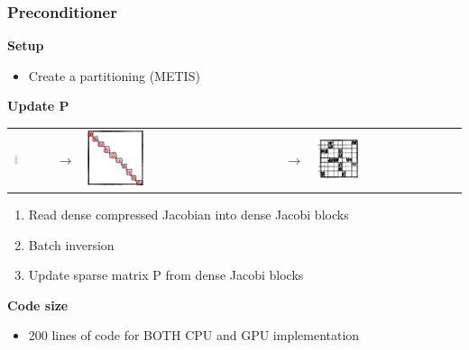 \begin{frame}
  \frametitle{Preconditioner}
  {\bf Setup}
  \begin{itemize}
    \item Create a partitioning (METIS)
  \end{itemize}
  {\bf Update P}
  \begin{tabular}{m{}m{}m{}m{}m{}}
        \includegraphics[width=0.15\textwidth]{./figures/compressed}
    &
    {\Huge $\rightarrow$}
    &
        \includegraphics[width=0.3\textwidth]{figures/gpublocks}
    &
    {\Huge $\rightarrow$}
    &
        \includegraphics[width=0.3\textwidth]{./figures/csr}
    \\
  \end{tabular}
    \begin{enumerate}
      \item Read dense compressed Jacobian into dense Jacobi blocks
      \item Batch inversion
      \item Update sparse matrix P from dense Jacobi blocks
    \end{enumerate}
  {\bf Code size}
  \begin{itemize}
    \item 200 lines of code for BOTH CPU and GPU implementation
  \end{itemize}
\end{frame}

